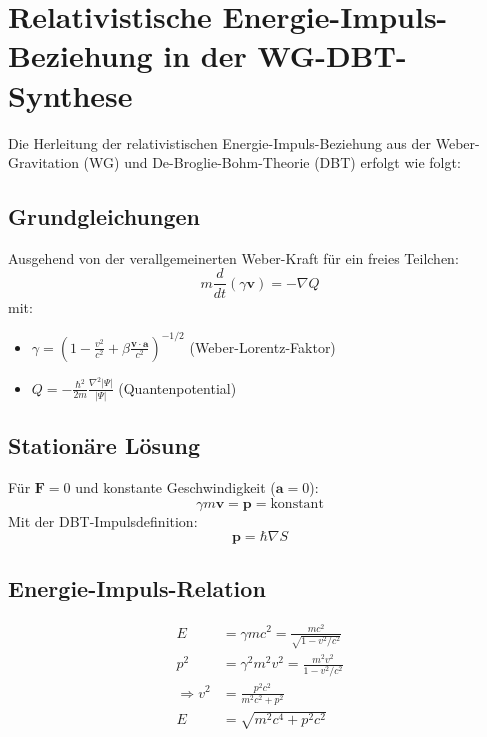 \section{Relativistische Energie-Impuls-Beziehung in der WG-DBT-Synthese}
\label{sec:energy-momentum}

Die Herleitung der relativistischen Energie-Impuls-Beziehung aus der Weber-Gravitation (WG) und De-Broglie-Bohm-Theorie (DBT) erfolgt wie folgt:

\subsection{Grundgleichungen}
Ausgehend von der verallgemeinerten Weber-Kraft für ein freies Teilchen:
\begin{equation}
m\frac{d}{dt}(\gamma\mathbf{v}) = -\nabla Q
\end{equation}
mit:
\begin{itemize}
\item $\gamma = (1 - \frac{v^2}{c^2} + \beta\frac{\mathbf{v}\cdot\mathbf{a}}{c^2})^{-1/2}$ (Weber-Lorentz-Faktor)
\item $Q = -\frac{\hbar^2}{2m}\frac{\nabla^2|\Psi|}{|\Psi|}$ (Quantenpotential)
\end{itemize}

\subsection{Stationäre Lösung}
Für $\mathbf{F} = 0$ und konstante Geschwindigkeit ($\mathbf{a} = 0$):
\begin{equation}
\gamma m\mathbf{v} = \mathbf{p} = \text{konstant}
\end{equation}
Mit der DBT-Impulsdefinition:
\begin{equation}
\mathbf{p} = \hbar\nabla S
\end{equation}

\subsection{Energie-Impuls-Relation}
\begin{align}
E &= \gamma mc^2 = \frac{mc^2}{\sqrt{1-v^2/c^2}} \\
p^2 &= \gamma^2m^2v^2 = \frac{m^2v^2}{1-v^2/c^2} \\
\Rightarrow v^2 &= \frac{p^2c^2}{m^2c^2 + p^2} \\
E &= \sqrt{m^2c^4 + p^2c^2}
\end{align}

